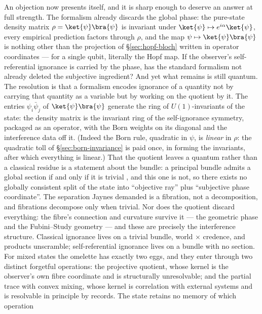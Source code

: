 An objection now presents itself, and it is sharp enough to deserve an
answer at full strength. The formalism already discards the global
phase: the pure-state density matrix $\rho = \ket{\psi}\bra{\psi}$ is
invariant under $\ket{\psi} \mapsto e^{i\alpha}\ket{\psi}$, every
empirical prediction factors through $\rho$, and the map
$\psi \mapsto \ket{\psi}\bra{\psi}$ is nothing other than the
projection of \S\ref{sec:hopf-bloch} written in operator coordinates --- for
a single qubit, literally the Hopf map. If the observer's
self-referential ignorance is carried by the phase, has the standard
formalism not already deleted the subjective ingredient? And yet what
remains is still quantum. The resolution is that a formalism encodes
ignorance of a quantity not by carrying that quantity as a variable
but by working on the quotient by it. The entries $\psi_i\bar\psi_j$
of $\ket{\psi}\bra{\psi}$ generate the ring of $U(1)$-invariants of
the state: the density matrix is the invariant ring of the
self-ignorance symmetry, packaged as an operator, with the Born
weights on its diagonal and the interference data off it. (Indeed the
Born rule, quadratic in $\psi$, is \emph{linear} in $\rho$: the
quadratic toll of \S\ref{sec:born-invariance} is paid once, in forming the
invariants, after which everything is linear.) That the quotient
leaves a quantum rather than a classical residue is a statement about
the bundle: a principal bundle admits a global section if and only if
it is trivial \autocite{steenrod1951topology}, and this one is not, so
there exists no globally consistent split of the state into
``objective ray'' plus ``subjective phase coordinate''. The separation
Jaynes demanded \autocite{Jaynes_89_a} is a fibration, not a
decomposition, and fibrations decompose only when trivial. Nor does
the quotient discard everything: the fibre's connection and curvature
survive it --- the geometric phase \autocite{berry1984quantal} and the
Fubini--Study geometry --- and these are precisely the interference
structure. Classical ignorance lives on a trivial bundle, world
$\times$ credence, and products unscramble; self-referential ignorance
lives on a bundle with no section.
For mixed states the omelette has exactly two eggs, and they enter
through two distinct forgetful operations: the projective quotient,
whose kernel is the observer's own fibre coordinate and is
structurally unresolvable; and the partial trace with convex mixing,
whose kernel is correlation with external systems and is resolvable in
principle by records. The state retains no memory of which operation
